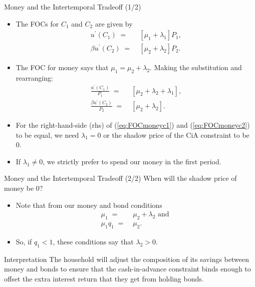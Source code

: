 \documentclass[10pt,c,aspectratio=1610,handout]{beamer}
\begin{document}
\begin{frame}{Money and the Intertemporal Tradeoff (1/2)}%
  \begin{itemize}%
    \item[$\blacktriangleright$] The FOCs for $C_{1}$ and $C_2$ are given by%
    \begin{align*}
      u^{\prime}(C_{1}) \; = & \; \left[ \mu_{1} + \lambda_{1} \right] P_{1},\\%
      \beta u^{\prime}(C_{2}) \; = & \; \left[ \mu_{2} + \lambda_{2} \right] P_{2}.%
    \end{align*}%
    \pause%
    \item[$\blacktriangleright$] The FOC for money says that $\mu_{1}=\mu _{2}+\lambda _{2}.$ Making the substitution and rearranging:%
    \begin{align}
      \frac{u^{\prime}(C_{1})}{P_{1}} \; = & \; \left[ \mu_{2} + \lambda_{2} + \lambda_{1} \right],\label{eq:FOCmoneyc1}\\%
      \frac{\beta u^{\prime}(C_{2})}{P_{2}} \; = & \; \left[ \mu_{2} + \lambda_{2} \right].\label{eq:FOCmoneyc2}%
    \end{align}%
    \pause%
    \item[$\blacktriangleright$]For the right-hand-side (rhs) of (\ref{eq:FOCmoneyc1}) and (\ref{eq:FOCmoneyc2}) to be equal, we need $\lambda_{1}=0$ or the shadow price of the CiA constraint to be 0.%
    \pause%
    \item[$\blacktriangleright$] If $\lambda_1 \neq 0$, we strictly prefer to spend our money in the first period.%
  \end{itemize}%
\end{frame}%
\begin{frame}{Money and the Intertemporal Tradeoff (2/2)}%
  When will the shadow price of money be 0?%
  \pause%
  \begin{itemize}%
    \item[$\blacktriangleright$] Note that from our money and bond conditions%
    \begin{align*}%
      \mu_{1} \; = & \; \mu_{2} + \lambda_{2} \text{ and } \\%
      \mu_{1} q_{1} \; = & \; \mu_{2}.%
    \end{align*}%
    \pause%
    \item[$\blacktriangleright$] So, if $q_{1}<1$, these conditions say that $\lambda_{2}>0.$%
  \end{itemize}%
  \pause%
  \begin{block}{Interpretation}%
    The household will adjust the composition of its savings between money and bonds to ensure that the cash-in-advance constraint binds enough to offset the extra interest return that they get from holding bonds.%
  \end{block}%
\end{frame}%
\end{document}
